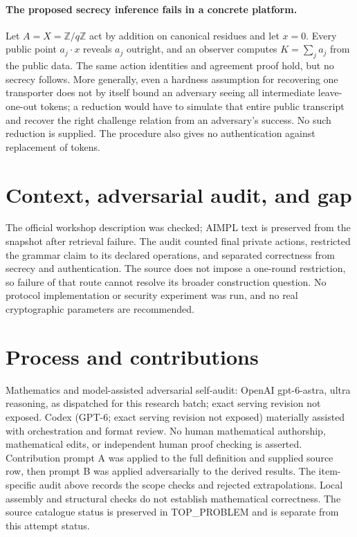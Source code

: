 \documentclass[11pt]{article}
\begin{document}
\paragraph{The proposed secrecy inference fails in a concrete platform.}
Let $A=X=\mathbb Z/q\mathbb Z$ act by addition on canonical residues and
let $x=0$. Every public point $a_j\cdot x$ reveals $a_j$ outright, and
an observer computes $K=\sum_j a_j$ from the public data. The same action
identities and agreement proof hold, but no secrecy follows. More generally,
even a hardness assumption for recovering one transporter does not by itself
bound an adversary seeing all intermediate leave-one-out tokens; a reduction
would have to simulate that entire public transcript and recover the right
challenge relation from an adversary's success. No such reduction is supplied.
The procedure also gives no authentication against replacement of tokens.

\section{Context, adversarial audit, and gap}
The official workshop description was checked; AIMPL text is preserved from
the snapshot after retrieval failure. The audit counted final private actions,
restricted the grammar claim to its declared operations, and separated
correctness from secrecy and authentication. The source does not impose a
one-round restriction, so failure of that route cannot resolve its broader
construction question. No protocol implementation or security experiment was
run, and no real cryptographic parameters are recommended.

\section{Process and contributions}
Mathematics and model-assisted adversarial self-audit: OpenAI gpt-6-astra, ultra reasoning, as dispatched for this research batch; exact serving revision not exposed. Codex (GPT-6; exact serving revision not exposed) materially assisted with orchestration and format review. No human mathematical authorship, mathematical edits, or independent human proof checking is asserted.
Contribution prompt A was applied to the full definition and supplied source row, then prompt B was applied adversarially to the derived results. The item-specific audit above records the scope checks and rejected extrapolations. Local assembly and structural checks do not establish mathematical correctness. The source catalogue status is preserved in TOP\_PROBLEM and is separate from this attempt status.
\end{document}
